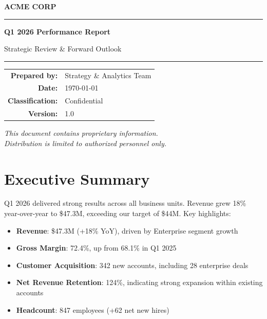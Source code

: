 \documentclass[11pt,a4paper]{article}
\begin{document}
\begin{titlepage}
    \centering
    \vspace*{2cm}

    {\Huge\textbf{\textcolor{accentblue}{ACME CORP}}}

    \vspace{1.5cm}
    \rule{\textwidth}{1pt}
    \vspace{0.5cm}

    {\LARGE\textbf{Q1 2026 Performance Report}}

    \vspace{0.3cm}
    {\large Strategic Review \& Forward Outlook}

    \vspace{0.5cm}
    \rule{\textwidth}{1pt}

    \vspace{2cm}

    \begin{tabular}{rl}
        \textbf{Prepared by:} & Strategy \& Analytics Team \\
        \textbf{Date:} & \today \\
        \textbf{Classification:} & Confidential \\
        \textbf{Version:} & 1.0 \\
    \end{tabular}

    \vfill
    {\small\textit{This document contains proprietary information.\\
    Distribution is limited to authorized personnel only.}}
\end{titlepage}

\newpage
\tableofcontents
\newpage

\section{Executive Summary}
\label{sec:summary}

Q1 2026 delivered strong results across all business units. Revenue grew 18\% year-over-year to \$47.3M, exceeding our target of \$44M. Key highlights:

\begin{itemize}
    \item \textbf{Revenue}: \$47.3M (+18\% YoY), driven by Enterprise segment growth
    \item \textbf{Gross Margin}: 72.4\%, up from 68.1\% in Q1 2025
    \item \textbf{Customer Acquisition}: 342 new accounts, including 28 enterprise deals
    \item \textbf{Net Revenue Retention}: 124\%, indicating strong expansion within existing accounts
    \item \textbf{Headcount}: 847 employees (+62 net new hires)
\end{itemize}
\end{document}
